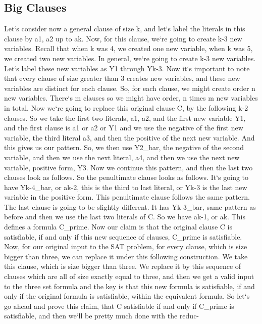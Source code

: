 \subsection{Big Clauses}
Let`s consider now a general clause of size k, and let`s label the literals in this clause by a1, a2 up to ak.
Now, for this clause, we`re going to create k-3 new variables.
Recall that when k was 4, we created one new variable, when k was 5, we created two new variables.
In general, we`re going to create k-3 new variables.
Let`s label these new variables as Y1 through Yk-3.
Now it`s important to note that every clause of size greater than 3 creates new variables, and these new variables are distinct for each clause.
So, for each clause, we might create order n new variables.
There`s m clauses so we might have order, n times m new variables in total.
Now we`re going to replace this original clause C, by the following k-2 clauses.
So we take the first two literals, a1, a2, and the first new variable Y1, and the first clause is a1 or a2 or Y1 and we use the negative of the first new variable, the third literal a3, and then the positive of the next new variable.
And this gives us our pattern.
So, we then use Y2\_bar, the negative of the second variable, and then we use the next literal, a4, and then we use the next new variable, positive form, Y3.
Now we continue this pattern, and then the last two clauses look as follows.
So the penultimate clause looks as follows.
It`s going to have Yk-4\_bar, or ak-2, this is the third to last literal, or Yk-3 is the last new variable in the positive form.
This penultimate clause follows the same pattern.
The last clause is going to be slightly different.
It has Yk-3\_bar, same pattern as before and then we use the last two literals of C\@.
So we have ak-1, or ak.
This defines a formula C\_prime.
Now our claim is that the original clause C is satisfiable, if and only if this new sequence of clauses, C\_prime is satisfiable.
Now, for our original input to the SAT problem, for every clause, which is size bigger than three, we can replace it under this following construction.
We take this clause, which is size bigger than three.
We replace it by this sequence of clauses which are all of size exactly equal to three, and then we get a valid input to the three set formula and the key is that this new formula is satisfiable, if and only if the original formula is satisfiable, within the equivalent formula.
So let`s go ahead and prove this claim, that C satisfiable if and only if C\_prime is satisfiable, and then we`ll be pretty much done with the reduc-

